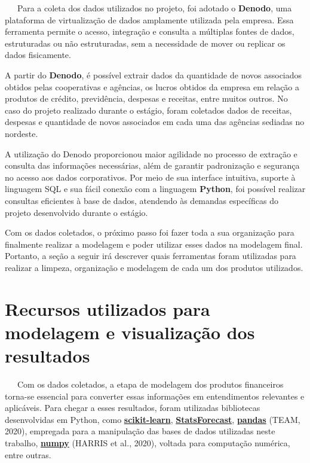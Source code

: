 \documentclass[
  12pt,
  a4paper,
]{scrreprt}
\begin{document}
~~~Para a coleta dos dados utilizados no projeto, foi adotado o
\textbf{Denodo}, uma plataforma de virtualização de dados amplamente
utilizada pela empresa. Essa ferramenta permite o acesso, integração e
consulta a múltiplas fontes de dados, estruturadas ou não estruturadas,
sem a necessidade de mover ou replicar os dados fisicamente.

\vspace{12pt}

A partir do \textbf{Denodo}, é possível extrair dados da quantidade de
novos associados obtidos pelas cooperativas e agências, os lucros
obtidos da empresa em relação a produtos de crédito, previdência,
despesas e receitas, entre muitos outros. No caso do projeto realizado
durante o estágio, foram coletados dados de receitas, despesas e
quantidade de novos associados em cada uma das agências sediadas no
nordeste.

\vspace{12pt}

A utilização do Denodo proporcionou maior agilidade no processo de
extração e consulta das informações necessárias, além de garantir
padronização e segurança no acesso aos dados corporativos. Por meio de
sua interface intuitiva, suporte à linguagem SQL e sua fácil conexão com
a linguagem \textbf{Python}, foi possível realizar consultas eficientes
à base de dados, atendendo às demandas específicas do projeto
desenvolvido durante o estágio.

\vspace{12pt}

Com os dados coletados, o próximo passo foi fazer toda a sua organização
para finalmente realizar a modelagem e poder utilizar esses dados na
modelagem final. Portanto, a seção a seguir irá descrever quais
ferramentas foram utilizadas para realizar a limpeza, organização e
modelagem de cada um dos produtos utilizados.

\section{Recursos utilizados para modelagem e visualização dos
resultados}\label{recursos-utilizados-para-modelagem-e-visualizauxe7uxe3o-dos-resultados}

~~~Com os dados coletados, a etapa de modelagem dos produtos financeiros
torna-se essencial para converter essas informações em entendimentos
relevantes e aplicáveis. Para chegar a esses resultados, foram
utilizadas bibliotecas desenvolvidas em Python, como
\href{https://scikit-learn.org/stable/}{\textbf{scikit-learn}},
\href{https://nixtlaverse.nixtla.io/statsforecast/index.html}{\textbf{StatsForecast}},
\href{https://pandas.pydata.org/}{\textbf{pandas}} (TEAM, 2020),
empregada para a manipulação das bases de dados utilizadas neste
trabalho, \href{https://numpy.org/}{\textbf{numpy}} (HARRIS et al.,
2020), voltada para computação numérica, entre outras.
\end{document}
